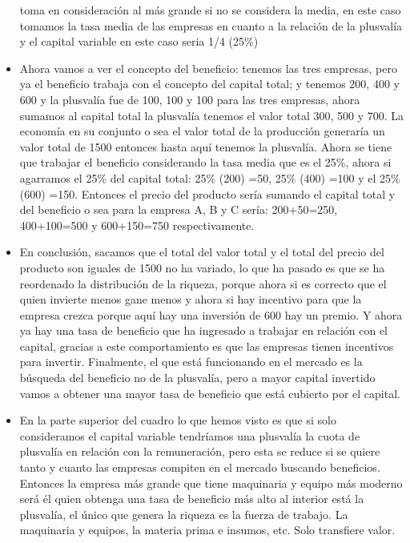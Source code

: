 \documentclass[
  letterpaper,
  DIV=11,
  numbers=noendperiod]{scrartcl}
\begin{document}
\begin{itemize}
  toma en consideración al más grande si no se considera la media, en
  este caso tomamos la tasa media de las empresas en cuanto a la
  relación de la plusvalía y el capital variable en este caso seria 1/4
  (25\%)
\item
  Ahora vamos a ver el concepto del beneficio: tenemos las tres
  empresas, pero ya el beneficio trabaja con el concepto del capital
  total; y tenemos 200, 400 y 600 y la plusvalía fue de 100, 100 y 100
  para las tres empresas, ahora sumamos al capital total la plusvalía
  tenemos el valor total 300, 500 y 700. La economía en su conjunto o
  sea el valor total de la producción generaría un valor total de 1500
  entonces hasta aquí tenemos la plusvalía. Ahora se tiene que trabajar
  el beneficio considerando la tasa media que es el 25\%, ahora si
  agarramos el 25\% del capital total: 25\% (200) =50, 25\% (400) =100 y
  el 25\% (600) =150. Entonces el precio del producto sería sumando el
  capital total y del beneficio o sea para la empresa A, B y C sería:
  200+50=250, 400+100=500 y 600+150=750 respectivamente.
\item
  En conclusión, sacamos que el total del valor total y el total del
  precio del producto son iguales de 1500 no ha variado, lo que ha
  pasado es que se ha reordenado la distribución de la riqueza, porque
  ahora si es correcto que el quien invierte menos gane menos y ahora si
  hay incentivo para que la empresa crezca porque aquí hay una inversión
  de 600 hay un premio. Y ahora ya hay una tasa de beneficio que ha
  ingresado a trabajar en relación con el capital, gracias a este
  comportamiento es que las empresas tienen incentivos para invertir.
  Finalmente, el que está funcionando en el mercado es la búsqueda del
  beneficio no de la plusvalía, pero a mayor capital invertido vamos a
  obtener una mayor tasa de beneficio que está cubierto por el capital.
\item
  En la parte superior del cuadro lo que hemos visto es que si solo
  consideramos el capital variable tendríamos una plusvalía la cuota de
  plusvalía en relación con la remuneración, pero esta se reduce si se
  quiere tanto y cuanto las empresas compiten en el mercado buscando
  beneficios. Entonces la empresa más grande que tiene maquinaria y
  equipo más moderno será él quien obtenga una tasa de beneficio más
  alto al interior está la plusvalía, el único que genera la riqueza es
  la fuerza de trabajo. La maquinaria y equipos, la materia prima e
  insumos, etc. Solo transfiere valor.
\end{itemize}
\end{document}
